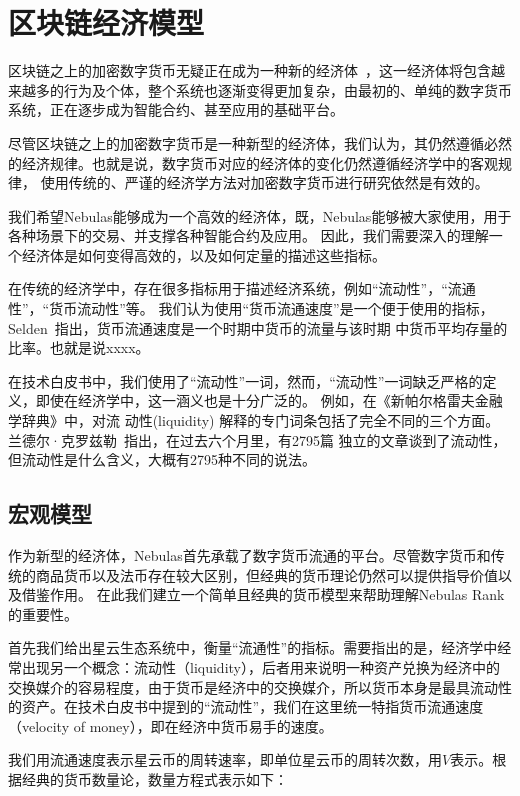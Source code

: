 
\section{区块链经济模型}
区块链之上的加密数字货币无疑正在成为一种新的经济体~\cite{neweco}，这一经济体将包含越来越多的行为及个体，整个系统也逐渐变得更加复杂，由最初的、单纯的数字货币系统，正在逐步成为智能合约、甚至应用的基础平台。

尽管区块链之上的加密数字货币是一种新型的经济体，我们认为，其仍然遵循必然的经济规律。也就是说，数字货币对应的经济体的变化仍然遵循经济学中的客观规律，
使用传统的、严谨的经济学方法对加密数字货币进行研究依然是有效的。

我们希望Nebulas能够成为一个高效的经济体，既，Nebulas能够被大家使用，用于各种场景下的交易、并支撑各种智能合约及应用。
因此，我们需要深入的理解一个经济体是如何变得高效的，以及如何定量的描述这些指标。

在传统的经济学中，存在很多指标用于描述经济系统，例如``流动性''，``流通性''，``货币流动性''等。
我们认为使用``货币流通速度''是一个便于使用的指标，Selden~\cite{selden}指出，货币流通速度是一个时期中货币的流量与该时期
中货币平均存量的比率。也就是说xxxx。




{\color{gray} 在技术白皮书中，我们使用了``流动性''一词，然而，``流动性''一词缺乏严格的定义，即使在经济学中，这一涵义也是十分广泛的。
例如，在《新帕尔格雷夫金融学辞典》中，对流
动性(liquidity) 解释的专门词条包括了完全不同的三个方面。兰德尔·克罗兹勒~\cite{randall}指出，在过去六个月里，有2795篇
独立的文章谈到了流动性，但流动性是什么含义，大概有2795种不同的说法。}

\subsection{宏观模型}
作为新型的经济体，Nebulas首先承载了数字货币流通的平台。尽管数字货币和传统的商品货币以及法币存在较大区别，但经典的货币理论仍然可以提供指导价值以及借鉴作用。
在此我们建立一个简单且经典的货币模型来帮助理解Nebulas Rank的重要性。

首先我们给出星云生态系统中，衡量“流通性”的指标。需要指出的是，经济学中经常出现另一个概念：流动性（liquidity），后者用来说明一种资产兑换为经济中的交换媒介的容易程度，由于货币是经济中的交换媒介，所以货币本身是最具流动性的资产。在技术白皮书中提到的“流动性”，我们在这里统一特指货币流通速度（velocity of money），即在经济中货币易手的速度。


我们用流通速度表示星云币的周转速率，即单位星云币的周转次数，用$V$表示。根据经典的货币数量论，数量方程式表示如下：

